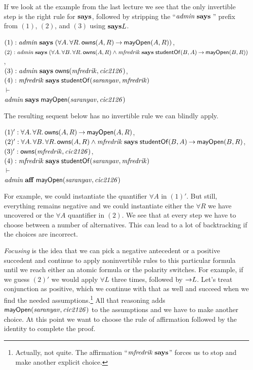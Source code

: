 \documentclass[11pt]{article}
\begin{document}
If we look at the example from the last lecture we see that the only invertible
step is the right rule for $\mathbf{says}$, followed by stripping the
``$\mi{admin} \says \null$'' prefix from $(1)$, $(2)$, and $(3)$ using
$\mathbf{says}L$.
\begin{tabbing}
  \quad $(1) : \mathit{admin} \mathrel{\mathbf{says}} (\forall A.\, \forall R.\, \mathsf{owns}(A, R) \mathbin{\rightarrow} \mathsf{mayOpen}(A, R))$, \\
  \quad $(2) : \mathit{admin} \mathrel{\mathbf{says}} (\forall A.\, \forall B.\, \forall R.\, \mathsf{owns}(A, R)
  \land \mathit{mfredrik} \mathrel{\mathbf{says}} \mathsf{studentOf}(B, A) \mathbin{\rightarrow} \mathsf{mayOpen}(B, R))$, \\[1ex]
  \quad $(3) : \mathit{admin} \mathrel{\mathbf{says}} \mathsf{owns}(\mathit{mfredrik}, \mathit{cic2126})$, \\
  \quad $(4) : \mathit{mfredrik} \mathrel{\mathbf{says}} \mathsf{studentOf}(\mathit{saranyav}, \mathit{mfredrik})$ \\[1ex]
  \quad $\vdash$ \\[1ex]
  \quad $\mathit{admin} \mathrel{\mathbf{says}} \mathsf{mayOpen}(\mathit{saranyav}, \mathit{cic2126})$
\end{tabbing}

\clearpage
\noindent The resulting sequent below has no invertible rule we can blindly apply.
\begin{tabbing}
  \quad $(1)' : \forall A.\, \forall R.\, \mathsf{owns}(A, R) \mathbin{\rightarrow} \mathsf{mayOpen}(A, R)$, \\
  \quad $(2)' : \forall A.\, \forall B.\, \forall R.\, \mathsf{owns}(A, R)
  \land \mathit{mfredrik} \mathrel{\mathbf{says}} \mathsf{studentOf}(B, A) \mathbin{\rightarrow} \mathsf{mayOpen}(B, R)$, \\[1ex]
  \quad $(3)' : \mathsf{owns}(\mathit{mfredrik}, \mathit{cic2126})$, \\
  \quad $(4) : \mathit{mfredrik} \mathrel{\mathbf{says}} \mathsf{studentOf}(\mathit{saranyav}, \mathit{mfredrik})$ \\[1ex]
  \quad $\vdash$ \\[1ex]
  \quad $\mathit{admin} \mathrel{\mathbf{aff}} \mathsf{mayOpen}(\mathit{saranyav}, \mathit{cic2126})$
\end{tabbing}
For example, we could instantiate the quantifier $\forall A$ in $(1)'$.  But
still, everything remains negative and we could instantiate either the
$\forall R$ we have uncovered or the $\forall A$ quantifier in $(2)$.  We see
that at every step we have to choose between a number of alternatives.  This can
lead to a lot of backtracking if the choices are incorrect.

\emph{Focusing} \citep{Andreoli92jlc} is the idea that we can pick a negative
antecedent or a positive succedent and continue to apply noninvertible rules to
this particular formula until we reach either an atomic formula or the polarity
switches.  For example, if we guess $(2)'$ we would apply ${\forall}L$ three
times, followed by ${\mathbin{\rightarrow}}L$.  Let's treat conjunction as positive, which we
continue with that as well and succeed when we find the needed
assumptions.\footnote{Actually, not quite.  The affirmation ``$\mathit{mfredrik} \mathrel{\mathbf{says}}$''
  forces us to stop and make another explicit choice.}  All that reasoning adds
$\mathsf{mayOpen}(\mathit{saranyav}, \mathit{cic2126})$ to the assumptions and we have to make
another choice.  At this point we want to choose the rule of affirmation
followed by the identity to complete the proof.
\end{document}
